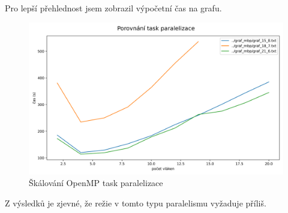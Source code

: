 \FloatBarrier

Pro lepší přehlednost jsem zobrazil výpočetní čas na grafu.


\begin{figure}[!htbp]
\centerline{\includegraphics[scale=.46]{images/porovnání_task_paralelizace.png}}
\caption{Škálování OpenMP task paralelizace}
\end{figure}

\FloatBarrier

Z výsledků je zjevné, že režie v tomto typu paralelismu vyžaduje příliš.
